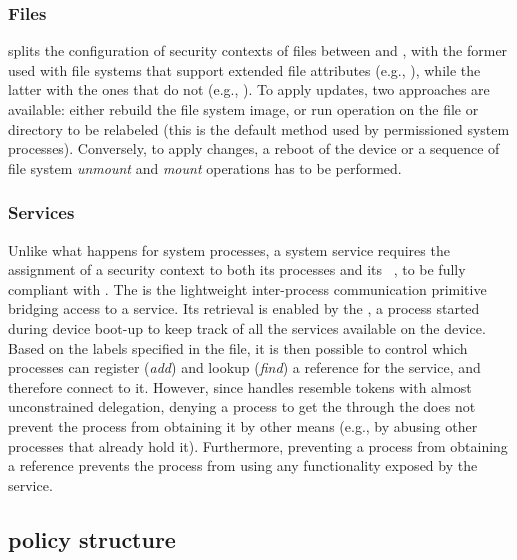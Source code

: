\subsubsection{Files}

\sel splits the configuration of security contexts of files between
\filecontexts and \genfscontexts, with the former used with
file systems that support extended file attributes (e.g., \data), while
the latter with the ones that do not (e.g., \proc).  To apply
\filecontexts updates, two approaches are available: either rebuild
the file system image, or run \restorecon operation on the file or
directory to be relabeled (this is the default method used by
permissioned system processes).  Conversely, to apply \genfscontexts
changes, a reboot of the device or a sequence of file system {\em
  unmount} and {\em mount} operations has to be performed.

\subsubsection{Services}

Unlike what happens for system processes, a system service requires
the assignment of a security context to both its processes and its
\binder~\cite{seapp_binder}, to be fully compliant with \sea.  The
\binder is the lightweight inter-process communication primitive
bridging access to a service.  Its retrieval is enabled by the
\servicemanager, a process started during device boot-up to keep track
of all the services available on the device.  Based on the labels
specified in the \servicecontexts file, it is then possible to control
which processes can register ({\em add}) and lookup ({\em find}) a
\binder reference for the service, and therefore connect to it.
However, since \binder handles resemble tokens with almost
unconstrained delegation, denying a process to get the \binder through
the \servicemanager does not prevent the process from obtaining it by
other means (e.g., by abusing other processes that already hold it).
Furthermore, preventing a process from obtaining a \binder reference
prevents the process from using any functionality exposed by the
service.

\subsection{\seapp policy structure}\label{subsect:seapp_structure}

